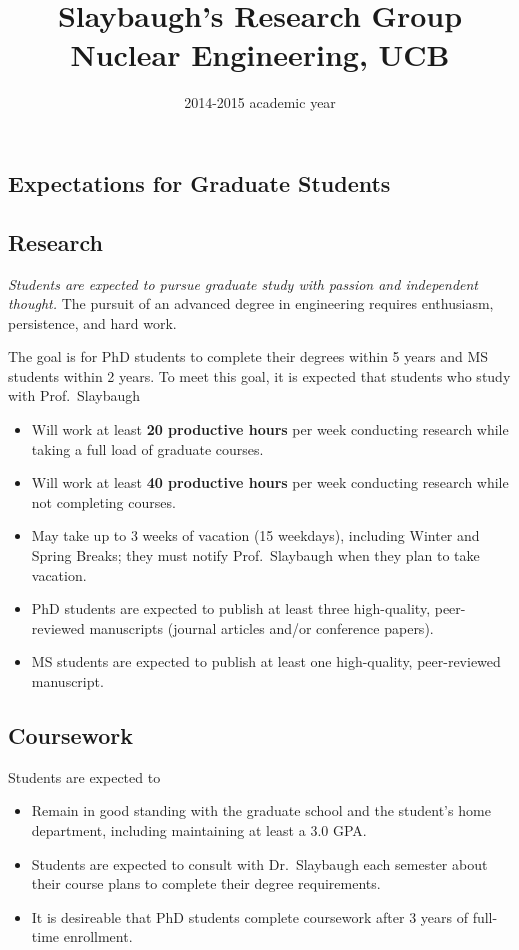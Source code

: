 \documentclass[12pt,twoside]{article}
\date{2014-2015 academic year}
\title{Slaybaugh's Research Group \\ Nuclear Engineering, UCB}
\begin{document}
\maketitle


\begin{center}
\section*{Expectations for Graduate Students}
\end{center}

\subsection*{Research}

\textit{Students are expected to pursue graduate study with passion and independent thought.} The pursuit of an advanced degree in engineering requires enthusiasm, persistence, and hard work. 

The goal is for PhD students to complete their degrees within 5 years and MS students within 2 years. To meet this goal, it is expected that students who study with Prof.\ Slaybaugh
%
\begin{itemize}
\item Will work at least \textbf{20 productive hours} per week conducting research while taking a full load of graduate courses.
\item Will work at least \textbf{40 productive hours} per week conducting research while not completing courses.
\item May take up to 3 weeks of vacation (15 weekdays), including Winter and Spring Breaks; they must notify Prof.\ Slaybaugh when they plan to take vacation.
\item PhD students are expected to publish at least three high-quality, peer-reviewed manuscripts (journal articles and/or conference papers).
\item MS students are expected to publish at least one high-quality, peer-reviewed manuscript.
\end{itemize}

\subsection*{Coursework}

Students are expected to 
%
\begin{itemize}
\item Remain in good standing with the graduate school and the student's home department, including maintaining at least a 3.0 GPA.
\item Students are expected to consult with Dr.\ Slaybaugh each semester about their course plans to complete their degree requirements.
\item It is desireable that PhD students complete coursework after 3 years of full-time enrollment. 
\end{itemize}
\end{document}
